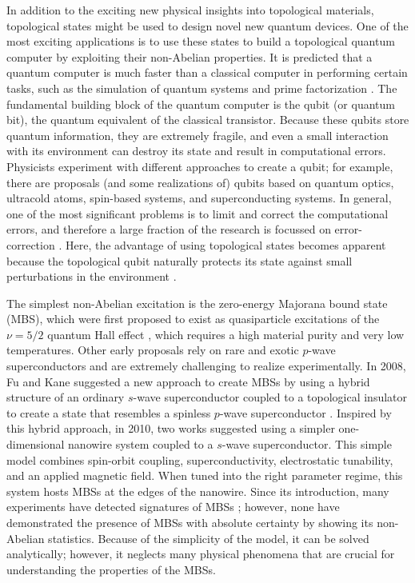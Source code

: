 In addition to the exciting new physical insights into topological materials, topological states might be used to design novel new quantum devices.
One of the most exciting applications is to use these states to build a topological quantum computer by exploiting their non-Abelian properties.
It is predicted that a quantum computer is much faster than a classical computer in performing certain tasks, such as the simulation of quantum systems \cite{Feynman1982} and prime factorization \cite{Shor1994}.
The fundamental building block of the quantum computer is the qubit (or quantum bit), the quantum equivalent of the classical transistor.
Because these qubits store quantum information, they are extremely fragile, and even a small interaction with its environment can destroy its state and result in computational errors.
Physicists experiment with different approaches to create a qubit; for example, there are proposals (and some realizations of) qubits based on quantum optics, ultracold atoms, spin-based systems, and superconducting systems.  %
In general, one of the most significant problems is to limit and correct the computational errors, and therefore a large fraction of the research is focussed on error-correction \cite{Lidar2013}.
Here, the advantage of using topological states becomes apparent because the topological qubit naturally protects its state against small perturbations in the environment \cite{Nayak2008}.

The simplest non-Abelian excitation is the zero-energy Majorana bound state (MBS), which were first proposed to exist as quasiparticle excitations of the $\nu = 5/2$ quantum Hall effect \cite{Read2000,Moore1991}, which requires a high material purity and very low temperatures.
Other early proposals \cite{Gurarie2005,Sarma2006,Tewari2007} rely on rare and exotic $p$-wave superconductors and are extremely challenging to realize experimentally.
In 2008, Fu and Kane suggested a new approach to create MBSs by using a hybrid structure of an ordinary $s$-wave superconductor coupled to a topological insulator to create a state that resembles a spinless $p$-wave superconductor \cite{Fu2008}.
Inspired by this hybrid approach, in 2010, two works \cite{Lutchyn2010,Oreg2010} suggested using a simpler one-dimensional nanowire system coupled to a $s$-wave superconductor.
This simple model combines spin-orbit coupling, superconductivity, electrostatic tunability, and an applied magnetic field.
When tuned into the right parameter regime, this system hosts MBSs at the edges of the nanowire.
Since its introduction, many experiments have detected signatures of MBSs \cite{Mourik2012,Das2012,Deng2012,Deng2016,Deng2016a,Chen2017a}; however, none have demonstrated the presence of MBSs with absolute certainty by showing its non-Abelian statistics.
Because of the simplicity of the model, it can be solved analytically; however, it neglects many physical phenomena that are crucial for understanding the properties of the MBSs.

